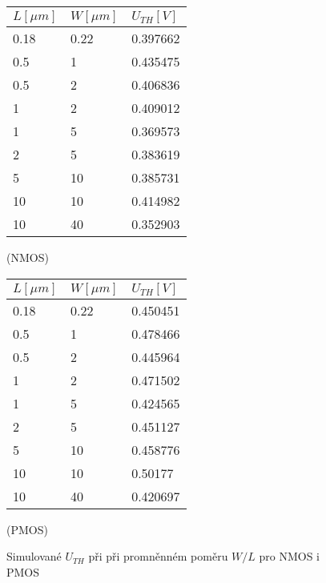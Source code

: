 \begin{figure}[H]
    \begin{minipage}{0.5\textwidth}
        \centering
        \begin{tabular}{|l|l|l|}
            \hline
            \(L [\mu m]\) & \(W [\mu m]\)   & \(U_{TH} [V]\)    \\ \hline
            0.18          & 0.22            & 0.397662	        \\ \hline
            0.5	          & 1               & 0.435475          \\ \hline
            0.5	          & 2               & 0.406836	        \\ \hline
            1	          & 2               & 0.409012	        \\ \hline
            1	          & 5               & 0.369573	        \\ \hline
            2	          & 5               & 0.383619	        \\ \hline
            5	          & 10              & 0.385731          \\ \hline
            10	          & 10              & 0.414982	        \\ \hline
            10	          & 40              & 0.352903	        \\ \hline
        \end{tabular}
        \caption{(NMOS)}
    \end{minipage}
    \hfill
    \begin{minipage}{0.5\textwidth}
        \centering
        \begin{tabular}{|l|l|l|}
            \hline
            \(L [\mu m]\) & \(W [\mu m]\)   & \(U_{TH} [V]\)    \\ \hline
            0.18          & 0.22            & 0.450451	        \\ \hline
            0.5	          & 1               & 0.478466          \\ \hline
            0.5	          & 2               & 0.445964	        \\ \hline
            1	          & 2               & 0.471502	        \\ \hline
            1	          & 5               & 0.424565	        \\ \hline
            2	          & 5               & 0.451127	        \\ \hline
            5	          & 10              & 0.458776          \\ \hline
            10	          & 10              & 0.50177	        \\ \hline
            10	          & 40              & 0.420697	        \\ \hline
        \end{tabular}
        \caption{(PMOS)}
    \end{minipage}
    \caption{\label{fig:tab_UTH}  Simulované \(U_{TH}\) při při promněnném poměru \(W/L\) pro NMOS i PMOS}
\end{figure}